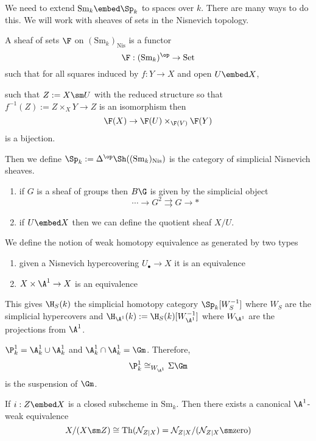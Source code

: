 \documentclass{article}
\newcommand{\Sm}{\mathrm{Sm}}
\newcommand{\Nis}{\mathrm{Nis}}
\newcommand{\Set}{\mathrm{Set}}
\newcommand{\Th}{\mathrm{Th}}
\newcommand{\cN}{\mathcal{N}}
\begin{document}
We need to extend $\Sm_k \embed \Sp_k$ to spaces over $k$. There are many ways to do this. We will work with sheaves of sets in the Nisnevich topology. 

\begin{defn}
A sheaf of sets $\F$ on $(\Sm_k)_{\Nis}$ is a functor
\[ \F : (\Sm_k)^{\op} \to \Set \]
such that for all squares induced by \etale $f : Y \to X$ and open $U \embed X$,
\begin{center}
\end{center}
such that $Z := X \sm U$ with the reduced structure so that $f^{-1}(Z) := Z \times_X Y \to Z$ is an isomorphism then
\[ \F(X) \to \F(U) \times_{\F(V)} \F(Y) \]
is a bijection. 
\end{defn}

Then we define $\Sp_k := \Delta^{\op} \Sh((\Sm_k)_{\Nis})$  is the category of simplicial Nisnevich sheaves. 
\begin{enumerate}
\item if $G$ is a sheaf of groups then $B \G$ is given by the simplicial object
\[ \cdots \to G^2 \rightrightarrows G \to * \]
\item if $U \embed X$ then we can define the quotient sheaf $X / U$. 
\end{enumerate}

We define the notion of weak homotopy equivalence as generated by two types
\begin{enumerate}
\item given a Nisnevich hypercovering $U_\bullet \to X$ it is an equivalence
\item $X \times \A^1 \to X$ is an equivalence 
\end{enumerate}
This gives $\H_S(k)$ the simplicial homotopy category $\Sp_k [W_S^{-1}]$ where $W_S$ are the simplicial hypercovers and $\H_{\A^1}(k) := \H_S(k) [W_{\A^1}^{-1}]$ where $W_{\A^1}$ are the projections from $\A^1$.

\begin{example}
$\P^1_k = \A^1_k \cup \A^1_k$ and $\A^1_k \cap \A^1_k = \Gm$. Therefore,
\[ \P^1_k \cong_{W_{\A^1}} \Sigma \Gm \]
is the suspension of $\Gm$. 
\end{example}

\begin{theorem}[Purity]
If $i : Z \embed X$ is a closed subscheme in $\Sm_k$. Then there exists a canonical $\A^1$-weak equivalence
\[ X / (X \sm Z) \cong \Th(\cN_{Z|X}) = \cN_{Z|X} / (\cN_{Z|X} \sm \text{zero}) \]
\end{theorem}
\end{document}
